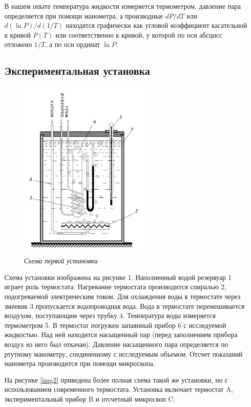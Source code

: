\documentclass[12pt,a4paper]{article}
\begin{document}
В нашем опыте температура жидкости измеряется термометром, давление пара определяется при помощи манометра, а производные $ dP/dT $ или $ d(\ln P)/d(1/T) $ находятся графически как угловой коэффициент касательной к кривой $ P(T) $ или соответственно к кривой, у которой по оси абсцисс отложено $ 1/T $, а по оси ординат $ \ln P $.

\subsection{Экспериментальная установка}

\begin{figure}
	\includegraphics[width=6.5cm]{2.4.1_1}
	\caption{\textit{Схема первой установки}}
	\label{img1}
\end{figure}

Схема установки изображена на рисунке 1. Наполненный водой резервуар 1 играет роль термостата. Нагревание термостата производится спиралью 2, подогреваемой электрическим током. Для охлаждения воды в термостате через змеевик 3 пропускается водопроводная вода. Вода в термостате перемешивается воздухом, поступающим через трубку 4. Температура воды измеряется термометром 5. В термостат погружен запаянный прибор 6 с исследуемой жидкостью. Над ней находится насыщенный пар (перед заполнением прибора воздух из него был откачан). Давление насыщенного пара определяется по ртутному манометру, соединенному с исследуемым объемом. Отсчет показаний манометра производится при помощи микроскопа.

На рисунке \ref{img2} приведена более полная схема такой же установки, но с использованием современного термостата. Установка включает термостат A, экспериментальный прибор B и отсчетный микроскоп C.
\end{document}
